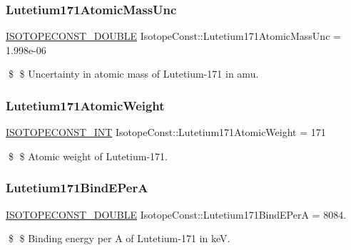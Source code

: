 \subsubsection{\texorpdfstring{Lutetium171\+Atomic\+Mass\+Unc}{Lutetium171AtomicMassUnc}}
{\footnotesize\ttfamily \mbox{\hyperlink{group___isotope_const-_macros_ga8f45a7272ce02c0b4c65c44636ed719a}{I\+S\+O\+T\+O\+P\+E\+C\+O\+N\+S\+T\+\_\+\+D\+O\+U\+B\+LE}} Isotope\+Const\+::\+Lutetium171\+Atomic\+Mass\+Unc = 1.\+998e-\/06}

\$ \$ Uncertainty in atomic mass of Lutetium-\/171 in amu. \mbox{\label{group___isotope_const-_lutetium-_lu171_gaf7b50d330e8a223bedf8777725502805}} 
\subsubsection{\texorpdfstring{Lutetium171\+Atomic\+Weight}{Lutetium171AtomicWeight}}
{\footnotesize\ttfamily \mbox{\hyperlink{group___isotope_const-_macros_ga5f18360b3e99483a35c32d789e62621c}{I\+S\+O\+T\+O\+P\+E\+C\+O\+N\+S\+T\+\_\+\+I\+NT}} Isotope\+Const\+::\+Lutetium171\+Atomic\+Weight = 171}

\$ \$ Atomic weight of Lutetium-\/171. \mbox{\label{group___isotope_const-_lutetium-_lu171_ga23d670772cfcc559e3a5a84467a781c3}} 
\subsubsection{\texorpdfstring{Lutetium171\+Bind\+E\+PerA}{Lutetium171BindEPerA}}
{\footnotesize\ttfamily \mbox{\hyperlink{group___isotope_const-_macros_ga8f45a7272ce02c0b4c65c44636ed719a}{I\+S\+O\+T\+O\+P\+E\+C\+O\+N\+S\+T\+\_\+\+D\+O\+U\+B\+LE}} Isotope\+Const\+::\+Lutetium171\+Bind\+E\+PerA = 8084.}

\$ \$ Binding energy per A of Lutetium-\/171 in keV. \mbox{\label{group___isotope_const-_lutetium-_lu171_ga11122793ceeb309aa169da15abba5eff}} 
